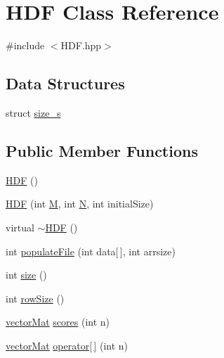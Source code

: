 \hypertarget{classHDF}{\section{H\-D\-F Class Reference}
\label{classHDF}
}


{\ttfamily \#include $<$H\-D\-F.\-hpp$>$}

\subsection*{Data Structures}
\begin{DoxyCompactItemize}
\item 
struct \hyperlink{structHDF_1_1size__s}{size\-\_\-s}
\end{DoxyCompactItemize}
\subsection*{Public Member Functions}
\begin{DoxyCompactItemize}
\item 
\hyperlink{classHDF_a1e33708a192cf30a7bf826b5d53d42cd}{H\-D\-F} ()
\item 
\hyperlink{classHDF_a0f564af287f47d1761e1bd2aaf0bdf48}{H\-D\-F} (int \hyperlink{classHDF_aee1593ceda7b33a941e52e9f6e998f51}{M}, int \hyperlink{classHDF_ab3b5c9aa5d584ac3aa16ee9c6d04c340}{N}, int initial\-Size)
\item 
virtual \hyperlink{classHDF_ad204a0f509d106b76dac0cef51eba755}{$\sim$\-H\-D\-F} ()
\item 
int \hyperlink{classHDF_af991e83807876fa0029b70b5c9a998b3}{populate\-File} (int data\mbox{[}$\,$\mbox{]}, int arrsize)
\item 
int \hyperlink{classHDF_a33415e3a4a7b17ab5530db3335b5c6f6}{size} ()
\item 
int \hyperlink{classHDF_a131cb3f6cc240a55a2bfa903c7eaff19}{row\-Size} ()
\item 
\hyperlink{types_8hpp_a3207a7addcfa415d1c83622febcb1e9b}{vector\-Mat} \hyperlink{classHDF_a99fee1b4aa1d3d6e4a667831e108945a}{scores} (int n)
\item 
\hyperlink{types_8hpp_a3207a7addcfa415d1c83622febcb1e9b}{vector\-Mat} \hyperlink{classHDF_a422ba198c00f10a40ff4e262a9925f10}{operator\mbox{[}$\,$\mbox{]}} (int n)
\end{DoxyCompactItemize}

